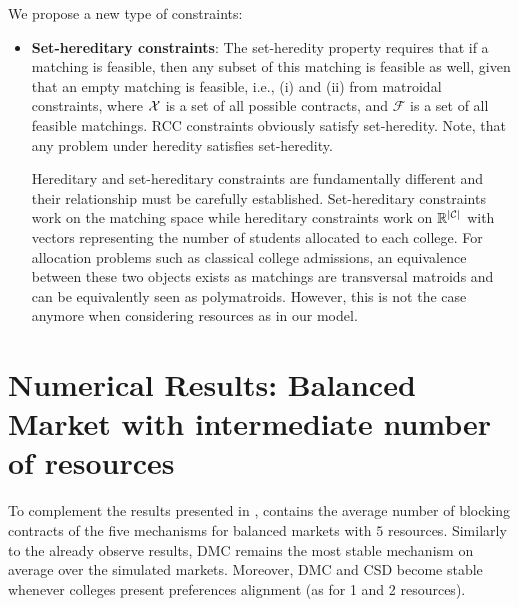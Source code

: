  We propose a new type of constraints:

\begin{itemize}
    \item \textbf{Set-hereditary constraints}: The set-heredity property requires that if a matching is feasible, then any subset of this matching is feasible as well, given that an empty matching is feasible, i.e., (i) and (ii) from matroidal constraints, where $\operatorname{{\color{black}\mathcal{X}}}$ is a set of all possible contracts, and $\mathcal{F}$ is a set of all feasible matchings. RCC constraints obviously satisfy set-heredity. Note, that any problem under heredity satisfies set-heredity.

    \begin{remark}
    Hereditary and set-hereditary constraints are fundamentally different and their relationship must be carefully established. Set-hereditary constraints work on the matching space while hereditary constraints work on $\mathbb{R}^{|{\operatorname{{\color{black}\mathcal{C}}}}|}$ with vectors representing the number of students allocated to each college. For allocation problems such as classical college admissions, an equivalence between these two objects exists as matchings are transversal matroids and can be equivalently seen as polymatroids. However, this is not the case anymore when considering resources as in our model.
    \end{remark}
\end{itemize}


\section{Numerical Results: Balanced Market with intermediate number of resources}\label{app:balanced_market_with_5_resources}

To complement the results presented in ,  contains the average number of blocking contracts of the five mechanisms for balanced markets with $5$ resources. Similarly to the already observe results, DMC remains the most stable mechanism on average over the simulated markets. Moreover, DMC and CSD become stable whenever colleges present preferences alignment (as for 1 and 2 resources).

